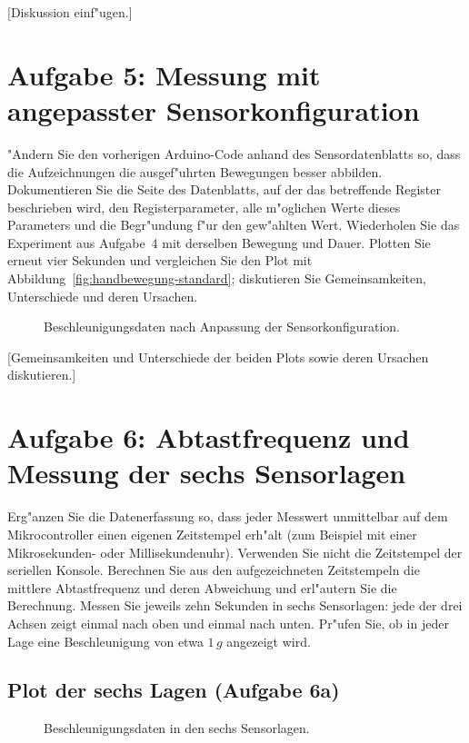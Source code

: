 \documentclass[a4paper,oneside,10pt]{article}%
\begin{document}
[Diskussion einf"ugen.]

\section{Aufgabe 5: Messung mit angepasster Sensorkonfiguration}
\label{sec:sensorkonfiguration}

"Andern Sie den vorherigen Arduino-Code anhand des Sensordatenblatts so, dass die Aufzeichnungen die ausgef"uhrten Bewegungen besser abbilden. Dokumentieren Sie die Seite des Datenblatts, auf der das betreffende Register beschrieben wird, den Registerparameter, alle m"oglichen Werte dieses Parameters und die Begr"undung f"ur den gew"ahlten Wert. Wiederholen Sie das Experiment aus Aufgabe~4 mit derselben Bewegung und Dauer. Plotten Sie erneut vier Sekunden und vergleichen Sie den Plot mit Abbildung~\ref{fig:handbewegung-standard}; diskutieren Sie Gemeinsamkeiten, Unterschiede und deren Ursachen.

\begin{figure}[H]
\centering
{}
\caption{Beschleunigungsdaten nach Anpassung der Sensorkonfiguration.}
\label{fig:handbewegung-angepasst}
\end{figure}

[Gemeinsamkeiten und Unterschiede der beiden Plots sowie deren Ursachen diskutieren.]

\section{Aufgabe 6: Abtastfrequenz und Messung der sechs Sensorlagen}
\label{sec:abtastung}

Erg"anzen Sie die Datenerfassung so, dass jeder Messwert unmittelbar auf dem Mikrocontroller einen eigenen Zeitstempel erh"alt (zum Beispiel mit einer Mikrosekunden- oder Millisekundenuhr). Verwenden Sie nicht die Zeitstempel der seriellen Konsole. Berechnen Sie aus den aufgezeichneten Zeitstempeln die mittlere Abtastfrequenz und deren Abweichung und erl"autern Sie die Berechnung. Messen Sie jeweils zehn Sekunden in sechs Sensorlagen: jede der drei Achsen zeigt einmal nach oben und einmal nach unten. Pr"ufen Sie, ob in jeder Lage eine Beschleunigung von etwa $1\,g$ angezeigt wird.

\subsection{Plot der sechs Lagen (Aufgabe 6a)}
\begin{figure}[H]
\centering
{}
\caption{Beschleunigungsdaten in den sechs Sensorlagen.}
\label{fig:sechs-lagen}
\end{figure}
\end{document}
